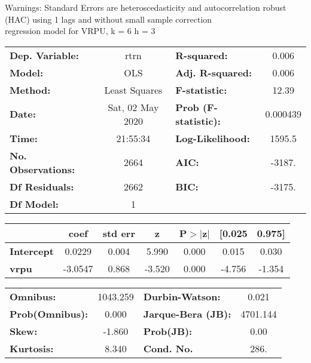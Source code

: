 Warnings: \newline
 [1] Standard Errors are heteroscedasticity and autocorrelation robust (HAC) using 1 lags and without small sample correction\\ 

regression model for VRPU, k = 6 h = 3\begin{center}
\begin{tabular}{lclc}
\toprule
\textbf{Dep. Variable:}    &       rtrn       & \textbf{  R-squared:         } &     0.006   \\
\textbf{Model:}            &       OLS        & \textbf{  Adj. R-squared:    } &     0.006   \\
\textbf{Method:}           &  Least Squares   & \textbf{  F-statistic:       } &     12.39   \\
\textbf{Date:}             & Sat, 02 May 2020 & \textbf{  Prob (F-statistic):} &  0.000439   \\
\textbf{Time:}             &     21:55:34     & \textbf{  Log-Likelihood:    } &    1595.5   \\
\textbf{No. Observations:} &        2664      & \textbf{  AIC:               } &    -3187.   \\
\textbf{Df Residuals:}     &        2662      & \textbf{  BIC:               } &    -3175.   \\
\textbf{Df Model:}         &           1      & \textbf{                     } &             \\
\bottomrule
\end{tabular}
\begin{tabular}{lcccccc}
                   & \textbf{coef} & \textbf{std err} & \textbf{z} & \textbf{P$> |$z$|$} & \textbf{[0.025} & \textbf{0.975]}  \\
\midrule
\textbf{Intercept} &       0.0229  &        0.004     &     5.990  &         0.000        &        0.015    &        0.030     \\
\textbf{vrpu}      &      -3.0547  &        0.868     &    -3.520  &         0.000        &       -4.756    &       -1.354     \\
\bottomrule
\end{tabular}
\begin{tabular}{lclc}
\textbf{Omnibus:}       & 1043.259 & \textbf{  Durbin-Watson:     } &    0.021  \\
\textbf{Prob(Omnibus):} &   0.000  & \textbf{  Jarque-Bera (JB):  } & 4701.144  \\
\textbf{Skew:}          &  -1.860  & \textbf{  Prob(JB):          } &     0.00  \\
\textbf{Kurtosis:}      &   8.340  & \textbf{  Cond. No.          } &     286.  \\
\bottomrule
\end{tabular}
\end{center}

